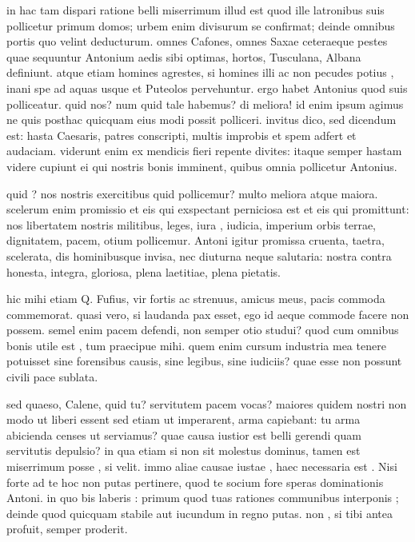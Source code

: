  in hac tam dispari ratione belli miserrimum illud est quod ille latronibus suis pollicetur primum domos; urbem enim divisurum se confirmat; deinde omnibus portis quo velint deducturum. omnes Cafones, omnes Saxae ceteraeque pestes quae sequuntur Antonium aedis sibi optimas, hortos, Tusculana, Albana definiunt. atque etiam homines agrestes, si homines illi ac non pecudes potius , inani spe ad aquas usque et Puteolos pervehuntur. ergo habet Antonius quod suis polliceatur. quid nos? num quid tale habemus? di meliora! id enim ipsum agimus ne quis posthac quicquam eius modi possit polliceri. invitus dico, sed dicendum est: hasta Caesaris, patres conscripti, multis improbis et spem adfert et audaciam. viderunt enim ex mendicis fieri repente divites: itaque semper hastam videre cupiunt ei qui nostris bonis imminent, quibus omnia pollicetur Antonius.

 quid ? nos nostris exercitibus quid pollicemur? multo meliora atque maiora. scelerum enim promissio et eis qui exspectant perniciosa est et eis qui promittunt: nos libertatem nostris militibus, leges, iura , iudicia, imperium orbis terrae, dignitatem, pacem, otium pollicemur. Antoni igitur promissa cruenta, taetra, scelerata, dis hominibusque invisa, nec diuturna neque salutaria: nostra contra honesta, integra, gloriosa, plena laetitiae, plena pietatis.

 hic mihi etiam Q. Fufius, vir fortis ac strenuus, amicus meus, pacis commoda commemorat. quasi vero, si laudanda pax esset, ego id aeque commode facere non possem. semel enim pacem defendi, non semper otio studui? quod cum omnibus bonis utile est , tum praecipue mihi. quem enim cursum industria mea tenere potuisset sine forensibus causis, sine legibus, sine iudiciis? quae esse non possunt civili pace sublata.

 sed quaeso, Calene, quid tu? servitutem pacem vocas? maiores quidem nostri non modo ut liberi essent sed etiam ut imperarent, arma capiebant: tu arma abicienda censes ut serviamus? quae causa iustior est belli gerendi quam servitutis depulsio? in qua etiam si non sit molestus dominus, tamen est miserrimum posse , si velit. immo aliae causae iustae , haec necessaria est . Nisi forte ad te hoc non putas pertinere, quod te socium fore speras dominationis Antoni. in quo bis laberis : primum quod tuas rationes communibus interponis ; deinde quod quicquam stabile aut iucundum in regno putas. non , si tibi antea profuit, semper proderit.

